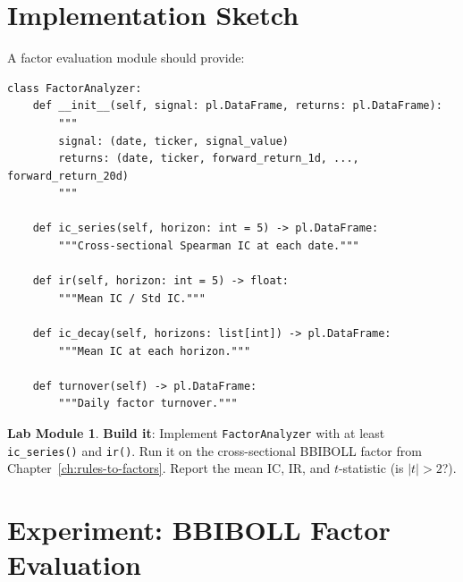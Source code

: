 \documentclass[a4paper, 11pt]{report}
\theoremstyle{definition}
\newtheorem{labmod}{Lab Module}[chapter]
\theoremstyle{remark}
\begin{document}
\section{Implementation Sketch}

A factor evaluation module should provide:

\begin{lstlisting}
class FactorAnalyzer:
    def __init__(self, signal: pl.DataFrame, returns: pl.DataFrame):
        """
        signal: (date, ticker, signal_value)
        returns: (date, ticker, forward_return_1d, ..., forward_return_20d)
        """

    def ic_series(self, horizon: int = 5) -> pl.DataFrame:
        """Cross-sectional Spearman IC at each date."""

    def ir(self, horizon: int = 5) -> float:
        """Mean IC / Std IC."""

    def ic_decay(self, horizons: list[int]) -> pl.DataFrame:
        """Mean IC at each horizon."""

    def turnover(self) -> pl.DataFrame:
        """Daily factor turnover."""
\end{lstlisting}

\begin{labmod}
    \textbf{Build it}: Implement \texttt{FactorAnalyzer} with at least
    \texttt{ic\_series()} and \texttt{ir()}.  Run it on the cross-sectional
    BBIBOLL factor from Chapter~\ref{ch:rules-to-factors}.  Report the mean IC,
    IR, and $t$-statistic (is $|t| > 2$?).
\end{labmod}

\section{Experiment: BBIBOLL Factor Evaluation}
\end{document}
